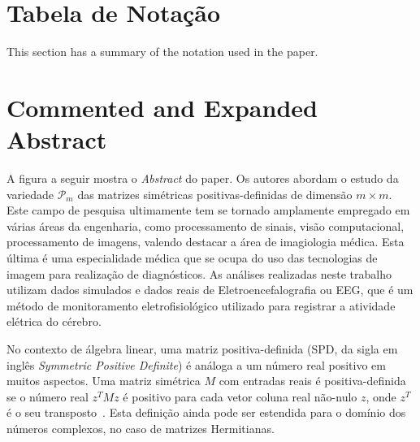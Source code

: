 \documentclass[a4paper,titlepage]{article}
\begin{document}
\section{Tabela de Notação}

This section has a summary of the notation used in the paper.

\section{Commented and Expanded Abstract}

A figura a seguir mostra o \textit{Abstract} do paper. Os autores abordam o
estudo da variedade $\mathcal{P}_m$ das matrizes simétricas positivas-definidas
de dimensão $m \times m$. Este campo de pesquisa ultimamente tem se tornado
amplamente empregado em várias áreas da engenharia, como processamento de
sinais, visão computacional, processamento de imagens, valendo destacar a área
de imagiologia médica. Esta última é uma especialidade médica que se ocupa do
uso das tecnologias de imagem para realização de diagnósticos. As análises
realizadas neste trabalho utilizam dados simulados e dados reais de
Eletroencefalografia ou EEG, que é um método de monitoramento eletrofisiológico
utilizado para registrar a atividade elétrica do cérebro. 

\begin{center}
  \vspace{1em}
  \vspace{1em}
\end{center}


No contexto de álgebra linear, uma matriz positiva-definida (SPD, da sigla em
inglês \textit{Symmetric Positive Definite}) é análoga a um número real
positivo em muitos aspectos. Uma matriz simétrica $M$ com entradas reais é
positiva-definida se o número real $z^T M z$ é positivo para cada vetor coluna
real não-nulo $z$, onde $z^T$ é o seu
transposto~\cite{doi:PositiveDefiniteMatrices}.  Esta definição ainda pode ser
estendida para o domínio dos números complexos, no caso de matrizes
Hermitianas.
\end{document}
